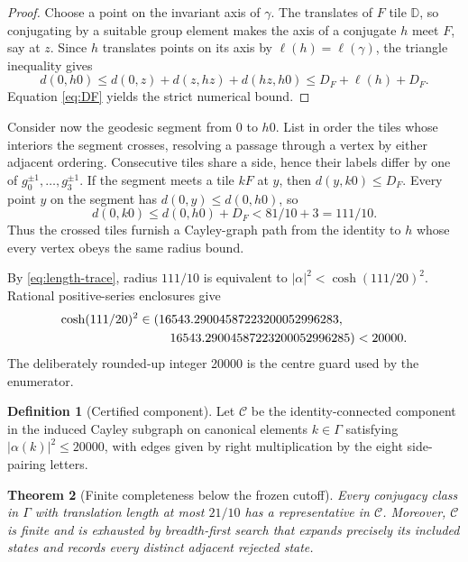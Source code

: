 \documentclass[11pt,a4paper]{article}
\newtheorem{theorem}{Theorem}[section]
\theoremstyle{definition}
\newtheorem{definition}[theorem]{Definition}
\newcommand{\D}{\mathbb D}
\newcommand{\length}{\ell}
\begin{document}
\begin{proof}
Choose a point on the invariant axis of \(\gamma\).  The translates of \(F\)
tile \(\D\), so conjugating by a suitable group element makes the axis of a
conjugate \(h\) meet \(F\), say at \(z\).  Since \(h\) translates points on its
axis by \(\length(h)=\length(\gamma)\), the triangle inequality gives
\[
 d(0,h0)\leq d(0,z)+d(z,hz)+d(hz,h0)
 \leq D_F+\length(h)+D_F.
\]
Equation \eqref{eq:DF} yields the strict numerical bound.
\end{proof}

Consider now the geodesic segment from \(0\) to \(h0\).  List in order the
tiles whose interiors the segment crosses, resolving a passage through a
vertex by either adjacent ordering.  Consecutive tiles share a side, hence
their labels differ by one of
\(g_0^{\pm1},\ldots,g_3^{\pm1}\).  If the segment meets a tile \(kF\) at
\(y\), then \(d(y,k0)\leq D_F\).  Every point \(y\) on the segment has
\(d(0,y)\leq d(0,h0)\), so
\begin{equation}\label{eq:chain-radius}
 d(0,k0)\leq d(0,h0)+D_F<81/10+3=111/10.
\end{equation}
Thus the crossed tiles furnish a Cayley-graph path from the identity to \(h\)
whose every vertex obeys the same radius bound.

By \eqref{eq:length-trace}, radius \(111/10\) is equivalent to
\(|\alpha|^2<\cosh(111/20)^2\).  Rational positive-series enclosures give
\begin{equation}\label{eq:guard}
\begin{aligned}
 \cosh(111/20)^2
 &\in(16543.29004587223200052996283,\\
 &\hspace{2.5em}16543.29004587223200052996285)<20000.
\end{aligned}
\end{equation}
The deliberately rounded-up integer 20000 is the centre guard used by the
enumerator.

\begin{definition}[Certified component]
Let \(\mathcal C\) be the identity-connected component in the induced Cayley
subgraph on canonical elements \(k\in\Gamma\) satisfying
\(|\alpha(k)|^2\leq20000\), with edges given by right multiplication by the
eight side-pairing letters.
\end{definition}

\begin{theorem}[Finite completeness below the frozen cutoff]
\label{thm:complete}
Every conjugacy class in \(\Gamma\) with translation length at most \(21/10\)
has a representative in \(\mathcal C\).  Moreover, \(\mathcal C\) is finite
and is exhausted by breadth-first search that expands precisely its included
states and records every distinct adjacent rejected state.
\end{theorem}
\end{document}
